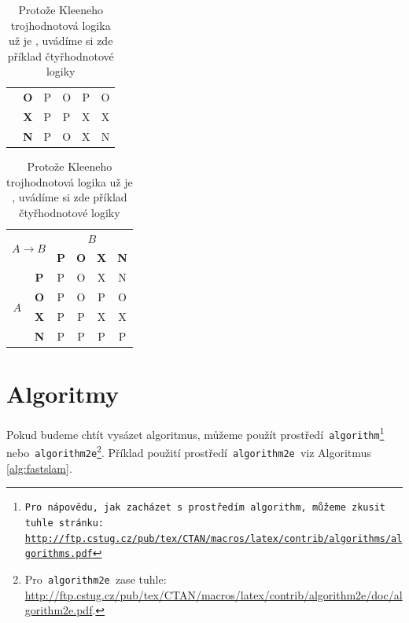 \documentclass[11pt]{article}
\begin{document}
\begin{table}[h]
\begin{tabular}{|c|c|c|c|c|c|}
                                                          & \textbf{O}               & P          & O          & P          & O \\
        \cline{2-6}
                                                          & \textbf{X}               & P          & P          & X          & X \\
        \cline{2-6}
                                                          & \textbf{N}               & P          & O          & X          & N \\
        \hline
    \end{tabular}
    \begin{tabular}{|c|c|c|c|c|c|}
        \hline
        \multicolumn{2}{|c|}{\multirow{2}{*}{$A \rightarrow B$}} & \multicolumn{4}{c|}{$B$}                                            \\
        \cline{3-6}
        \multicolumn{2}{|c|}{}                                   & \textbf{P}               & \textbf{O} & \textbf{X} & \textbf{N}     \\
        \hline
        \multirow{4}{*}{$A$}                                     & \textbf{P}               & P          & O          & X          & N \\
        \cline{2-6}
                                                                 & \textbf{O}               & P          & O          & P          & O \\
        \cline{2-6}
                                                                 & \textbf{X}               & P          & P          & X          & X \\
        \cline{2-6}
                                                                 & \textbf{N}               & P          & P          & P          & P \\
        \hline
    \end{tabular}

    \caption{Protože Kleeneho trojhodnotová logika už je , uvádíme si zde příklad čtyřhodnotové logiky}
    \label{tab:logic}
\end{table}
\bigskip
\pagebreak

\section{Algoritmy}
\label{sec:algorithms}
Pokud budeme chtít vysázet algoritmus, můžeme použít prostředí\texttt{ algorithm\footnote{Pro nápovědu, jak zacházet s~prostředím\texttt{ algorithm,} můžeme zkusit tuhle stránku:\\\url{http://ftp.cstug.cz/pub/tex/CTAN/macros/latex/contrib/algorithms/algorithms.pdf} } }
nebo\texttt{ algorithm2e}\footnote{Pro\texttt{ algorithm2e }zase tuhle: \url{http://ftp.cstug.cz/pub/tex/CTAN/macros/latex/contrib/algorithm2e/doc/algorithm2e.pdf}.}.
Příklad použití prostředí\texttt{ algorithm2e }viz Algoritmus \ref{alg:fastslam}.\\
\end{document}
